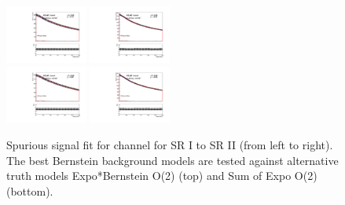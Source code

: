 \begin{figure}[htbp]
  \centering
 \includegraphics[width=0.24\textwidth]{figures/VBF/Spurious_ExpoO2_testVBF_ICHEP_2cen_SRI.pdf}
 \includegraphics[width=0.24\textwidth]{figures/VBF/Spurious_ExpoO2_testVBF_ICHEP_2cen_SRII.pdf}\\
 \includegraphics[width=0.24\textwidth]{figures/VBF/Spurious_SExpoO2_testVBF_ICHEP_2cen_SRI.pdf}
 \includegraphics[width=0.24\textwidth]{figures/VBF/Spurious_SExpoO2_testVBF_ICHEP_2cen_SRII.pdf}\\
\caption{Spurious signal fit for \twocentral channel for SR I to SR II (from left to right). The best Bernstein background models are tested against alternative truth models Expo*Bernstein O(2) (top) and Sum of Expo O(2) (bottom).}
  \label{fig:vbf-Fit_SP_2cen}
\end{figure}

